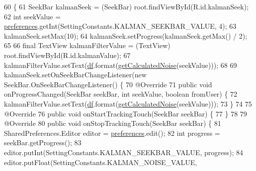 \begin{DoxyCode}
60                                                    \{
61         SeekBar kalmanSeek = (SeekBar) root.findViewById(R.id.kalmanSeek);
62         \textcolor{keywordtype}{int} seekValue = \hyperlink{classit_1_1unibo_1_1torsello_1_1bluetoothpositioning_1_1fragment_1_1SettingsFragment_a52480c4d5d81ca59fe4a98ae3c623ea4_a52480c4d5d81ca59fe4a98ae3c623ea4}{preferences}.getInt(SettingConstants.KALMAN\_SEEKBAR\_VALUE, 4);
63         kalmanSeek.setMax(10);
64         kalmanSeek.setProgress(kalmanSeek.getMax() / 2);
65 
66         \textcolor{keyword}{final} TextView kalmanFilterValue = (TextView) root.findViewById(R.id.kalmanValue);
67         kalmanFilterValue.setText(\hyperlink{classit_1_1unibo_1_1torsello_1_1bluetoothpositioning_1_1fragment_1_1SettingsFragment_af6b80a700dc80c39a56d001b68a47694_af6b80a700dc80c39a56d001b68a47694}{df}.format(\hyperlink{classit_1_1unibo_1_1torsello_1_1bluetoothpositioning_1_1fragment_1_1SettingsFragment_a595d859602f34ca81957a0578c1602a6_a595d859602f34ca81957a0578c1602a6}{getCalculatedNoise}(seekValue)));
68 
69         kalmanSeek.setOnSeekBarChangeListener(\textcolor{keyword}{new} SeekBar.OnSeekBarChangeListener() \{
70             @Override
71             \textcolor{keyword}{public} \textcolor{keywordtype}{void} onProgressChanged(SeekBar seekBar, \textcolor{keywordtype}{int} seekValue, \textcolor{keywordtype}{boolean} fromUser) \{
72                 kalmanFilterValue.setText(\hyperlink{classit_1_1unibo_1_1torsello_1_1bluetoothpositioning_1_1fragment_1_1SettingsFragment_af6b80a700dc80c39a56d001b68a47694_af6b80a700dc80c39a56d001b68a47694}{df}.format(\hyperlink{classit_1_1unibo_1_1torsello_1_1bluetoothpositioning_1_1fragment_1_1SettingsFragment_a595d859602f34ca81957a0578c1602a6_a595d859602f34ca81957a0578c1602a6}{getCalculatedNoise}(seekValue)));
73             \}
74 
75             @Override
76             \textcolor{keyword}{public} \textcolor{keywordtype}{void} onStartTrackingTouch(SeekBar seekBar) \{
77             \}
78 
79             @Override
80             \textcolor{keyword}{public} \textcolor{keywordtype}{void} onStopTrackingTouch(SeekBar seekBar) \{
81                 SharedPreferences.Editor editor = \hyperlink{classit_1_1unibo_1_1torsello_1_1bluetoothpositioning_1_1fragment_1_1SettingsFragment_a52480c4d5d81ca59fe4a98ae3c623ea4_a52480c4d5d81ca59fe4a98ae3c623ea4}{preferences}.edit();
82                 \textcolor{keywordtype}{int} progress = seekBar.getProgress();
83                 editor.putInt(SettingConstants.KALMAN\_SEEKBAR\_VALUE, progress);
84                 editor.putFloat(SettingConstants.KALMAN\_NOISE\_VALUE, 

\end{DoxyCode}
